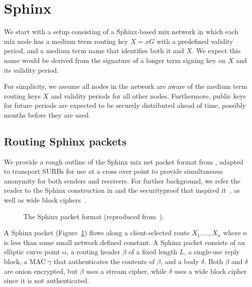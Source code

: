 
\section{Sphinx}\label{sec:sphinx}

We start with a setup consisting of a Sphinx-based mix network in
which each mix node has a medium term routing key $X = x G$ with a
predefined validity period, and a medium term name that identifies
both it and $X$.  We expect this name would be derived from the
signature of a longer term signing key on $X$ and its validity period.

For simplicity, we assume all nodes in the network are aware of the
medium term routing keys $X$ and validity periods for all other nodes.
Furthermore, public keys for future periods are expected to be
securely distributed ahead of time, possibly months before they are
used.


\subsection{Routing Sphinx packets}

We provide a rough outline of the Sphinx mix net packet format from 
\cite{Sphinx}, adapted to transport SURBs for use at a cross over point
to provide simultaneous anonymity for both senders and receivers.
For further background, we refer the reader to the Sphinx construction
in \cite{Sphinx} and the securityproof that inspired it~\cite{FormalOnion},
as well as wide block ciphers~\cite{Lionness}.

\begin{figure}
  \begin{center}
  
  \end{center}
  \caption{The Sphinx packet format (reproduced from~\cite{Sphinx}).}
  \label{fig:sphinx}
\end{figure}

A Sphinx packet (Figure~\ref{fig:sphinx}) flows along a client-selected
route $X_1,\ldots,X_n$ where $n$ is less than some small network defined
constant.  A Sphinx packet consists of an elliptic curve point $\alpha$,
a routing header $\beta$ of a fixed length $L$, a single-use reply block,
a MAC $\gamma$ that authenticates the contents of $\beta$, and a body
$\delta$.  Both $\beta$ and $\delta$ are onion encrypted, but $\beta$
uses a stream cipher, while $\delta$ uses a wide block cipher since
it is not authenticated.


